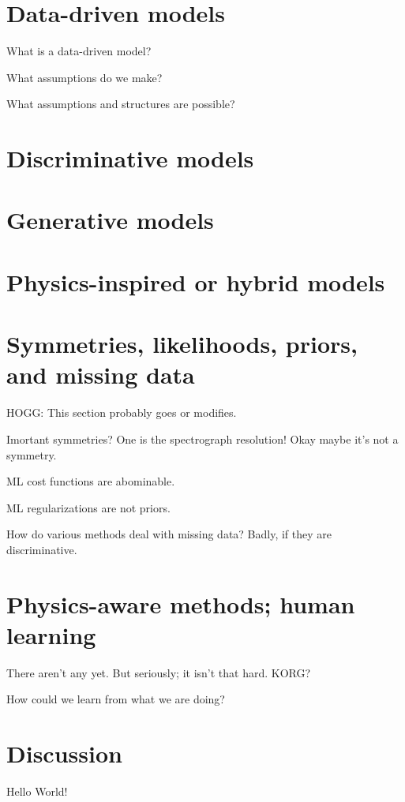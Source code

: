 \documentclass[modern]{aastex631}
\begin{document}
\section{Data-driven models}

What is a data-driven model?

What assumptions do we make?

What assumptions and structures are possible?

\section{Discriminative models}

\section{Generative models}

\section{Physics-inspired or hybrid models}

\section{Symmetries, likelihoods, priors, and missing data}

HOGG: This section probably goes or modifies.

Imortant symmetries? One is the spectrograph resolution! Okay maybe it's not a symmetry.

ML cost functions are abominable.

ML regularizations are not priors.

How do various methods deal with missing data? Badly, if they are discriminative.

\section{Physics-aware methods; human learning}

There aren't any yet. But seriously; it isn't that hard. KORG?

How could we learn from what we are doing?

\section{Discussion}

Hello World!

{}

\end{document}
